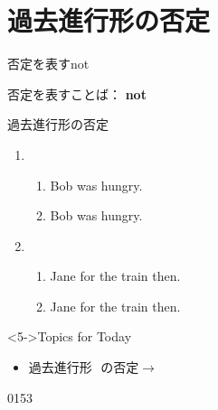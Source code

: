 \documentclass[aspectratio=169,xcolor={dvipsnames,table}]{beamer}
\begin{document}
\section{過去進行形の否定}
\begin{frame}[plain]{否定を表すnot}
 \Large

否定を表すことば： {\LARGE\bfseries not}\hspace{20pt}
\end{frame}
\begin{frame}[plain]{過去進行形の否定}
 \begin{enumerate}
  \item \begin{enumerate}
	 \item<1-> Bob was hungry.
	 \item<2-> Bob was  hungry.
	\end{enumerate}
  \item \begin{enumerate}
	 \item<3-> Jane  for the train then.
	 \item<4-> Jane    for the train then.
	\end{enumerate}
 \end{enumerate}

\begin{block}<5->{Topics for Today}\small
\begin{itemize}[square]
 \item  過去進行形\,\,\,\,の否定$\longrightarrow$\,\,%
  \end{itemize}
      \end{block}
\hfill{}


\hfill{\tiny 0153}\,{\scriptsize {}}

\end{frame}
\end{document}
